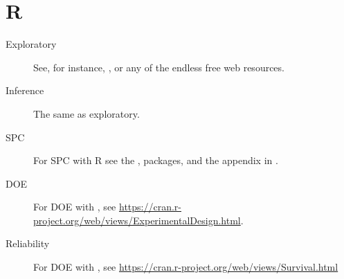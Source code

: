 


\chapter{R}
\label{apx:r}

\begin{description}
\item [Exploratory] See, for instance, \cite{venables_modern_2002}, or any of the endless free web resources. 
\item [Inference] The same as exploratory.
\item [SPC] For SPC with R see the ,  packages, and the appendix in \cite{qiu_introduction_2013}. 
\item [DOE] For DOE with \R, see \url{https://cran.r-project.org/web/views/ExperimentalDesign.html}.
\item [Reliability] For DOE with \R, see \url{https://cran.r-project.org/web/views/Survival.html}
\end{description}


